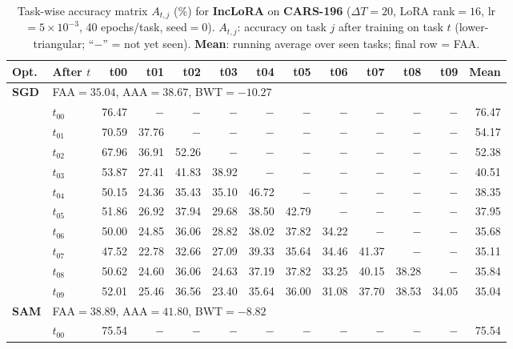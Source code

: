 \begin{table}[ht]
\centering
\caption{%
  Task-wise accuracy matrix $A_{t,j}$ (\%) for \textbf{IncLoRA} on \textbf{CARS-196} ($\Delta T=20$, LoRA rank$=16$, lr$=5\times10^{-3}$, 40 epochs/task, seed$=0$).
  $A_{t,j}$: accuracy on task $j$ after training on task $t$  (lower-triangular; ``$-$'' = not yet seen).
  \textbf{Mean}: running average over seen tasks; final row = FAA.
}
\label{tab:raw_inclora_cars196}
\setlength{\tabcolsep}{2.8pt}
\renewcommand{\arraystretch}{0.88}
\scriptsize
\begin{tabular}{@{}l l r r r r r r r r r r r@{}}
\toprule
\textbf{Opt.} & \textbf{After $t$} & \textbf{t00} & \textbf{t01} & \textbf{t02} & \textbf{t03} & \textbf{t04} & \textbf{t05} & \textbf{t06} & \textbf{t07} & \textbf{t08} & \textbf{t09} & \textbf{Mean} \\
\midrule
\multirow{11}{*}{\textbf{SGD}} & \multicolumn{12}{l}{\quad\small FAA$=35.04$,\; AAA$=38.67$,\; BWT$=-10.27$} \\
 & $t_{00}$ & 76.47 & $-$ & $-$ & $-$ & $-$ & $-$ & $-$ & $-$ & $-$ & $-$ & 76.47 \\
 & $t_{01}$ & 70.59 & 37.76 & $-$ & $-$ & $-$ & $-$ & $-$ & $-$ & $-$ & $-$ & 54.17 \\
 & $t_{02}$ & 67.96 & 36.91 & 52.26 & $-$ & $-$ & $-$ & $-$ & $-$ & $-$ & $-$ & 52.38 \\
 & $t_{03}$ & 53.87 & 27.41 & 41.83 & 38.92 & $-$ & $-$ & $-$ & $-$ & $-$ & $-$ & 40.51 \\
 & $t_{04}$ & 50.15 & 24.36 & 35.43 & 35.10 & 46.72 & $-$ & $-$ & $-$ & $-$ & $-$ & 38.35 \\
 & $t_{05}$ & 51.86 & 26.92 & 37.94 & 29.68 & 38.50 & 42.79 & $-$ & $-$ & $-$ & $-$ & 37.95 \\
 & $t_{06}$ & 50.00 & 24.85 & 36.06 & 28.82 & 38.02 & 37.82 & 34.22 & $-$ & $-$ & $-$ & 35.68 \\
 & $t_{07}$ & 47.52 & 22.78 & 32.66 & 27.09 & 39.33 & 35.64 & 34.46 & 41.37 & $-$ & $-$ & 35.11 \\
 & $t_{08}$ & 50.62 & 24.60 & 36.06 & 24.63 & 37.19 & 37.82 & 33.25 & 40.15 & 38.28 & $-$ & 35.84 \\
 & $t_{09}$ & 52.01 & 25.46 & 36.56 & 23.40 & 35.64 & 36.00 & 31.08 & 37.70 & 38.53 & 34.05 & 35.04 \\
\midrule
\multirow{11}{*}{\textbf{SAM}} & \multicolumn{12}{l}{\quad\small FAA$=38.89$,\; AAA$=41.80$,\; BWT$=-8.82$} \\
 & $t_{00}$ & 75.54 & $-$ & $-$ & $-$ & $-$ & $-$ & $-$ & $-$ & $-$ & $-$ & 75.54 \\

\end{tabular}
\end{table}
